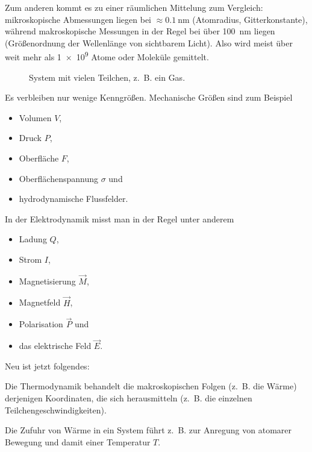 Zum anderen kommt es zu einer räumlichen Mittelung \textendash{} zum Vergleich: mikroskopische Abmessungen liegen bei $\approx\qty{0.1}{\nm}$ (Atomradius, Gitterkonstante), während makroskopische Messungen in der Regel bei über \qty{100}{\nm} liegen (Größenordnung der Wellenlänge von sichtbarem Licht).
Also wird meist über weit mehr als \num[print-unity-mantissa=false]{1e9} Atome oder Moleküle gemittelt.

\begin{figure}[htbp]
    \centering
    \tfigSystemWithManyParticles
    \caption{System mit vielen Teilchen, z.~B. ein Gas.}
    \label{fig:SystemWithManyParticles}
\end{figure}

Es verbleiben nur wenige Kenngrößen. Mechanische Größen sind zum Beispiel
\begin{itemize}
    \item Volumen $V$,
    \item Druck $P$,
    \item Oberfläche $F$,
    \item Oberflächenspannung $\sigma$ und
    \item hydrodynamische Flussfelder.
\end{itemize}

In der Elektrodynamik misst man in der Regel unter anderem
\begin{itemize}
    \item Ladung $Q$,
    \item Strom $I$,
    \item Magnetisierung $\vec M$,
    \item Magnetfeld $\vec H$,
    \item Polarisation $\vec P$ und
    \item das elektrische Feld $\vec E$.
\end{itemize}

Neu ist jetzt folgendes:
\begin{formal}
    Die Thermodynamik behandelt die makroskopischen Folgen (z.~B. die Wärme) derjenigen Koordinaten, die sich herausmitteln (z.~B. die einzelnen Teilchengeschwindigkeiten).%
\end{formal}

Die Zufuhr von Wärme in ein System führt z.~B. zur Anregung von atomarer Bewegung und damit einer Temperatur $T$.

